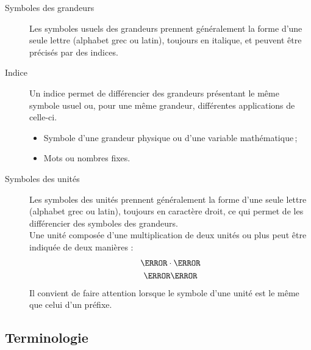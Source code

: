 \begin{description}
	\item[Symboles des grandeurs] Les symboles usuels des grandeurs prennent généralement la forme d'une seule lettre (alphabet grec ou latin), toujours en italique, et peuvent être précisés par des indices.
	\item [Indice] Un indice permet de différencier des grandeurs présentant le même symbole usuel ou, pour une même grandeur, différentes applications de celle-ci.
		\begin{itemize}
			\item Symbole d'une grandeur physique ou d'une variable mathématique\,;
			\item Mots ou nombres fixes.
		\end{itemize}
	\item[Symboles des unités] Les symboles des unités prennent généralement la forme d'une seule lettre (alphabet grec ou latin), toujours en caractère droit, ce qui permet de les différencier des symboles des grandeurs.\\
Une unité composée d'une multiplication de deux unités ou plus peut être indiquée de deux manières :
		\begin{gather*}
			\newton\cdot\metre \\ 
			\newton\metre
		\end{gather*}
Il convient de faire attention lorsque le symbole d'une unité est le même que celui d'un préfixe.
\end{description}

\subsection{Terminologie}


